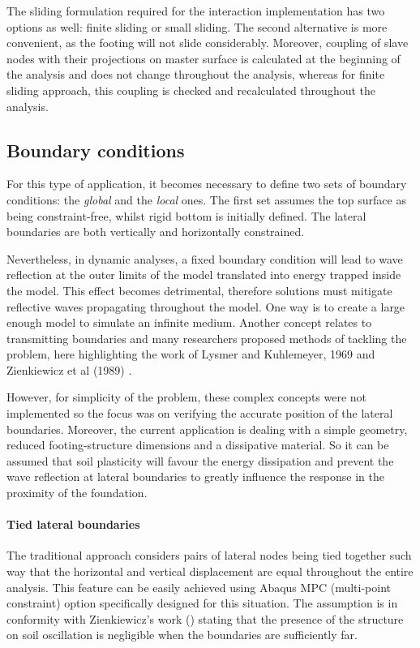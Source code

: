 The sliding formulation required for the interaction implementation has two options as well: finite sliding or small sliding. The second alternative is more convenient, as the footing will not slide considerably. Moreover, coupling of slave nodes with their projections on master surface is calculated at the beginning of the analysis and does not change throughout the analysis, whereas for finite sliding approach, this coupling is checked and recalculated throughout the analysis.

\subsection{Boundary conditions}
For this type of application, it becomes necessary to define two sets of boundary conditions: the \textit{global} and the \textit{local} ones. The first set assumes the top surface as being constraint-free, whilst rigid bottom is initially defined. The lateral boundaries are both vertically and horizontally constrained.

Nevertheless, in dynamic analyses, a fixed boundary condition will lead to wave reflection at the outer limits of the model translated into energy trapped inside the model. This effect becomes detrimental, therefore solutions must mitigate reflective waves propagating throughout the model. One way is to create a large enough model to simulate an infinite medium. Another concept relates to transmitting boundaries and many researchers proposed methods of tackling the problem, here highlighting the work of Lysmer and Kuhlemeyer, 1969 \cite{lysmer1969finite} and Zienkiewicz et al (1989) \cite{zienkiewicz1989earthquake}.

However, for simplicity of the problem, these complex concepts were not implemented so the focus was on verifying the accurate position of the lateral boundaries. Moreover, the current application is dealing with a simple geometry, reduced  footing-structure dimensions and a dissipative material. So it can be assumed that soil plasticity will favour the energy dissipation and prevent the wave reflection at lateral boundaries to greatly influence the response in the proximity of the foundation.

 \paragraph{Tied lateral boundaries}
	The traditional approach considers pairs of lateral nodes being tied together such way that the horizontal and vertical displacement are equal throughout the entire analysis. This feature can be easily achieved using Abaqus MPC (multi-point constraint) option specifically designed for this situation. The assumption is in conformity with Zienkiewicz's work (\cite{zienkiewicz1989earthquake}) stating that the presence of the structure on soil oscillation is negligible when the boundaries are sufficiently far.
	
